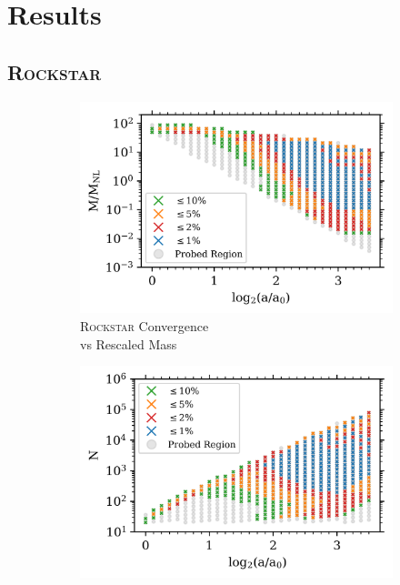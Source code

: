 \section{Results}\label{ch3_results}
\subsection{\textsc{Rockstar}}\label{rockstar_results}


\begin{figure}
\centering
\begin{subfigure}{.49\textwidth}
\centering
\includegraphics[width=\textwidth]{Ch3_Self_Sim/Paper_Plots_gtr20/Rockstar15_mean_past_joyce_mah_M200c_gtr20_FW_WW5_M_M_NL_vs_a_convergence_MT2_UVM_min_1000.png}
\caption{\textsc{Rockstar} Convergence\\ vs Rescaled Mass}
\end{subfigure}
\hfil
\begin{subfigure}{.49\textwidth}
\centering
\includegraphics[width=\textwidth]{Ch3_Self_Sim/Paper_Plots_gtr20/Rockstar_n15_mean_past_joyce_mah_M200c_gtr20_FW_WW5_N_vs_a_convergence_MT2_UVM_min_1000.png}

\end{subfigure}
\end{figure}
